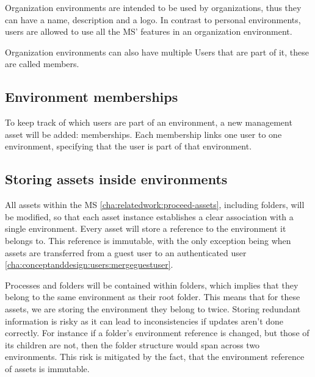 Organization environments are intended to be used by organizations, thus they can have a
name, description and a logo.
In contrast to personal environments, users are allowed to use all the MS' features in
an organization environment.


Organization environments can also have multiple Users that are part of it, these are
called members.

\subsection{Environment memberships}
\label{cha:conceptanddesign:environments:memberships}

To keep track of which users are part of an environment, a new management asset will be
added: memberships.
Each membership links one user to one environment, specifying that the user is part of
that environment.

\subsection{Storing assets inside environments}
\label{cha:conceptanddesign:environments:storing-assets}

All assets within the MS \ref{cha:relatedwork:proceed-assets}, including folders,
will be modified, so that each asset instance establishes a clear association with a single environment.
Every asset will store a reference to the environment it belongs to.
This reference is immutable, with the only exception being when assets are transferred
from a guest user to an authenticated user \ref{cha:conceptanddesign:users:mergeguestuser}.

Processes and folders will be contained within folders, which implies that they belong to
the same environment as their root folder.
This means that for these assets, we are storing the environment they belong to twice.
Storing redundant information is risky as it can lead to inconsistencies if updates aren't
done correctly.
For instance if a folder's environment reference is changed, but those of its children
are not, then the folder structure would span across two environments.
This risk is mitigated by the fact, that the environment reference of assets is immutable.

